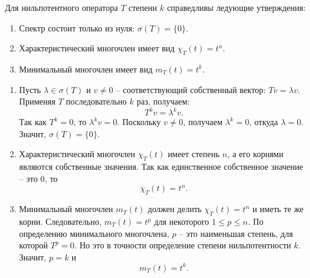 \documentclass[14pt]{extreport}
\begin{document}
    \begin{thbox}
        Для нильпотентного оператора $T$ степени $k$ справедливы ледующие утверждения:
        \begin{enumerate}
            \item Спектр состоит только из нуля: $\sigma(T) = \{0\}$.
            \item Характеристический многочлен имеет вид $\chi_T(t) = t^n$.
            \item Минимальный многочлен имеет вид $m_T(t) = t^k$.
        \end{enumerate}
    \end{thbox}
    \begin{prbox}
        \begin{enumerate}
            \item Пусть $\lambda \in \sigma(T)$ и $v \neq 0$ – соответствующий собственный вектор: $Tv = \lambda v$. Применяя $T$ последовательно $k$ раз, получаем:
            \[
            T^kv = \lambda^kv.
            \]
            Так как $T^k = 0$, то $\lambda^kv = 0$. Поскольку $v \neq 0$, получаем $\lambda^k = 0$, откуда $\lambda = 0$. Значит, $\sigma(T) = \{0\}$.

            \item Характеристический многочлен $\chi_T(t)$ имеет степень $n$, а его корнями являются собственные значения. Так как единственное собственное значение – это $0$, то
            \[
            \chi_T(t) = t^n.
            \]

            \item Минимальный многочлен $m_T(t)$ должен делить $\chi_T(t) = t^n$ и иметь те же корни. Следовательно, $m_T(t) = t^p$ для некоторого $1 \leq p \leq n$. По определению минимального многочлена, $p$ – это наименьшая степень, для которой $T^p = 0$. Но это в точности определение степени нильпотентности $k$. Значит, $p=k$ и
            \[
            m_T(t) = t^k.
            \]
        \end{enumerate}
    \end{prbox}
\end{document}
